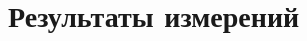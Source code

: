 \section{Результаты измерений}
\begin{table}[!ht]
    \centering
    \caption{}
    
\end{table}

\begin{table}[!ht]
    \centering
    \caption{ }
    
\end{table}

\begin{table}[!ht]
    \centering
    \caption{ }
    
\end{table}

\begin{figure}[ht!]
\end{figure}
\begin{figure}[ht!]
\end{figure}

